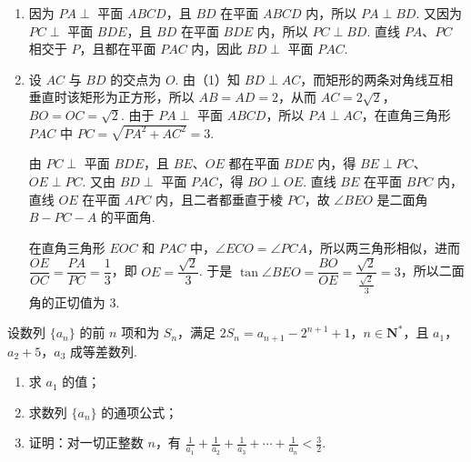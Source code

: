\begin{solution}
\begin{enumerate}
\item 因为 \(PA\perp\) 平面 \(ABCD\)，且 \(BD\) 在平面 \(ABCD\) 内，所以 \(PA\perp BD\). 又因为 \(PC\perp\) 平面 \(BDE\)，且 \(BD\) 在平面 \(BDE\) 内，所以 \(PC\perp BD\). 直线 \(PA\)、\(PC\) 相交于 \(P\)，且都在平面 \(PAC\) 内，因此 \(BD\perp\) 平面 \(PAC\).
\item 设 \(AC\) 与 \(BD\) 的交点为 \(O\). 由（1）知 \(BD\perp AC\)，而矩形的两条对角线互相垂直时该矩形为正方形，所以 \(AB=AD=2\)，从而 \(AC=2\sqrt{2}\)，\(BO=OC=\sqrt{2}\). 由于 \(PA\perp\) 平面 \(ABCD\)，所以 \(PA\perp AC\)，在直角三角形 \(PAC\) 中
\(PC=\sqrt{PA^2+AC^2}=3\).

由 \(PC\perp\) 平面 \(BDE\)，且 \(BE\)、\(OE\) 都在平面 \(BDE\) 内，得 \(BE\perp PC\)、\(OE\perp PC\). 又由 \(BD\perp\) 平面 \(PAC\)，得 \(BO\perp OE\). 直线 \(BE\) 在平面 \(BPC\) 内，直线 \(OE\) 在平面 \(APC\) 内，且二者都垂直于棱 \(PC\)，故 \(\angle BEO\) 是二面角 \(B-PC-A\) 的平面角.

在直角三角形 \(EOC\) 和 \(PAC\) 中，\(\angle ECO=\angle PCA\)，所以两三角形相似，进而 \(\dfrac{OE}{OC}=\dfrac{PA}{PC}=\dfrac{1}{3}\)，即 \(OE=\dfrac{\sqrt{2}}{3}\). 于是
\(\tan\angle BEO=\dfrac{BO}{OE}=\dfrac{\sqrt{2}}{\frac{\sqrt{2}}{3}}=3\)，所以二面角的正切值为 \(3\).
\end{enumerate}
\end{solution}

\begin{problem}
设数列 \(\{a_{n}\}\) 的前 \(n\) 项和为 \(S_{n}\)，满足 \(2S_{n} = a_{n + 1} - 2^{n + 1} + 1\)，\(n \in \mathbf{N}^{*}\)，且 \(a_{1}\)，\(a_{2} + 5\)，\(a_{3}\) 成等差数列.
\begin{enumerate}
\item 求 \(a_{1}\) 的值；
\item 求数列 \(\{a_{n}\}\) 的通项公式；
\item 证明：对一切正整数 \(n\)，有 \(\frac{1}{a_1} + \frac{1}{a_2} + \frac{1}{a_3} + \cdots + \frac{1}{a_n} < \frac{3}{2}\).
\end{enumerate}
\end{problem}


